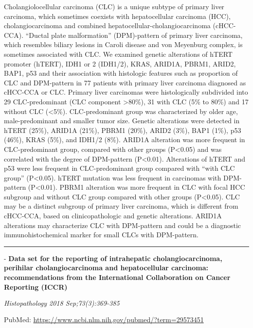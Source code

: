 \documentclass[]{article}
\begin{document}
Cholangiolocellular carcinoma (CLC) is a unique subtype of primary liver
carcinoma, which sometimes coexists with hepatocellular carcinoma (HCC),
cholangiocarcinoma and combined hepatocellular-cholangiocarcinoma
(cHCC-CCA). ``Ductal plate malformation'' (DPM)-pattern of primary liver
carcinoma, which resembles biliary lesions in Caroli disease and von
Meyenburg complex, is sometimes associated with CLC. We examined genetic
alterations of hTERT promoter (hTERT), IDH1 or 2 (IDH1/2), KRAS, ARID1A,
PBRM1, ARID2, BAP1, p53 and their association with histologic features
such as proportion of CLC and DPM-pattern in 77 patients with primary
liver carcinoma diagnosed as cHCC-CCA or CLC. Primary liver carcinomas
were histologically subdivided into 29 CLC-predominant (CLC component
\textgreater{}80\%), 31 with CLC (5\% to 80\%) and 17 without CLC
(\textless{}5\%). CLC-predominant group was characterized by older age,
male-predominant and smaller tumor size. Genetic alterations were
detected in hTERT (25\%), ARID1A (21\%), PBRM1 (20\%), ARID2 (3\%), BAP1
(1\%), p53 (46\%), KRAS (5\%), and IDH1/2 (8\%). ARID1A alteration was
more frequent in CLC-predominant group, compared with other groups
(P\textless{}0.05) and was correlated with the degree of DPM-pattern
(P\textless{}0.01). Alterations of hTERT and p53 were less frequent in
CLC-predominant group compared with ``with CLC group''
(P\textless{}0.05). hTERT mutation was less frequent in carcinomas with
DPM-pattern (P\textless{}0.01). PBRM1 alteration was more frequent in
CLC with focal HCC subgroup and without CLC group compared with other
groups (P\textless{}0.05). CLC may be a distinct subgroup of primary
liver carcinoma, which is different from cHCC-CCA, based on
clinicopathologic and genetic alterations. ARID1A alterations may
characterize CLC with DPM-pattern and could be a diagnostic
immunohistochemical marker for small CLCs with DPM-pattern.

{}

{}

\begin{center}\rule{0.5\linewidth}{\linethickness}\end{center}

 - \textbf{Data set for the reporting of intrahepatic
cholangiocarcinoma, perihilar cholangiocarcinoma and hepatocellular
carcinoma: recommendations from the International Collaboration on
Cancer Reporting (ICCR)}

\emph{Histopathology 2018 Sep;73(3):369-385}

PubMed: \url{https://www.ncbi.nlm.nih.gov/pubmed/?term=29573451}
\end{document}
